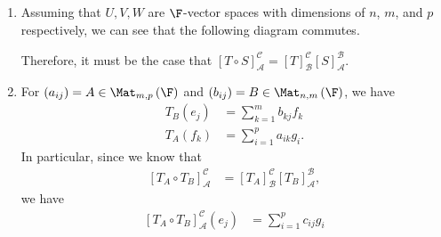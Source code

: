 \documentclass[10pt]{mypackage}
\begin{document}
\begin{solution}\hfill
  \begin{enumerate}[(1)]
    \item Assuming that $U,V,W$ are $\F$-vector spaces with dimensions of $n$, $m$, and $p$ respectively, we can see that the following diagram commutes.
      \begin{center}
      \end{center}
      Therefore, it must be the case that $\left[T\circ S\right]_{\mathcal{A}}^{\mathcal{C}} = \left[T\right]_{\mathcal{B}}^{\mathcal{C}} \left[S\right]_{\mathcal{A}}^{\mathcal{B}}$.
    \item For $\left(a_{ij}\right) = A \in \Mat_{m,p}\left(\F\right)$ and $\left(b_{ij}\right) = B \in \Mat_{n,m}\left(\F\right)$, we have
      \begin{align*}
        T_B\left(e_j\right) &= \sum_{k=1}^{m}b_{kj}f_k\\
        T_A\left(f_k\right) &= \sum_{i=1}^{p}a_{ik}g_i.
      \end{align*}
      In particular, since we know that
      \begin{align*}
        \left[T_A\circ T_B\right]_{\mathcal{A}}^{\mathcal{C}} &= \left[T_A\right]_{\mathcal{B}}^{\mathcal{C}}\left[T_B\right]_{\mathcal{A}}^{\mathcal{B}},
      \end{align*}
      we have
      \begin{align*}
        \left[T_A\circ T_B\right]_{\mathcal{A}}^{\mathcal{C}} \left(e_j\right) &= \sum_{i=1}^{p}c_{ij}g_{i}\\

\end{align*}
\end{enumerate}
\end{solution}
\end{document}
